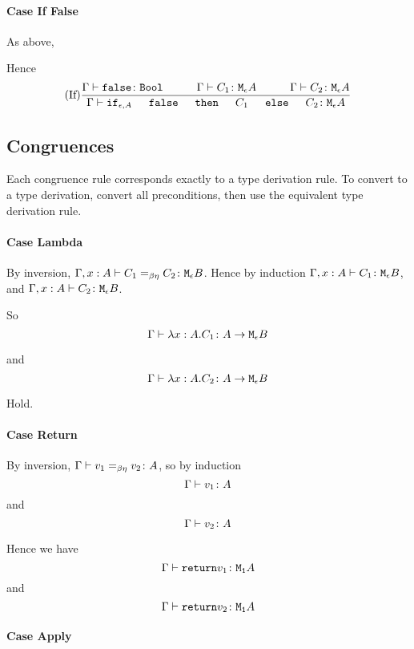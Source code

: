 {        \paragraph{Case If False}
        As above,

        Hence 
        \begin{equation}
            \treerule{If}{
                \gtyperelation{\f}{\B}
                \s\s
                \gtyperelation{C_1}{\mea}
                \s\s
                \gtyperelation{C_2}{\mea}
            }{
                \gtyperelation{\ifthenelse{\e}{A}{\f}{C_1}{C_2}}{\mea}
            }
    \end{equation}
        \subsection{Congruences}
    Each congruence rule corresponds exactly to a type derivation rule. To convert to a type derivation, convert all preconditions, then use the equivalent type derivation rule.

    \paragraph{Case Lambda}
        By inversion, $\Gamma, x: A \vdash C_1 =_{\beta\eta} C_2 \colon \texttt{M}_{\epsilon}{B}$. Hence by induction $\Gamma, x: A \vdash C_1 \colon \texttt{M}_{\epsilon}{B}$, and $\Gamma, x: A \vdash C_2 \colon \texttt{M}_{\epsilon}{B}$.

        So 
        \begin{equation}
            \Gamma \vdash \lambda x : A. C_1 \colon A \rightarrow \texttt{M}_{\epsilon}{B}
        \end{equation}

        and
        \begin{equation}
            \Gamma \vdash \lambda x : A. C_2 \colon A \rightarrow \texttt{M}_{\epsilon}{B}
        \end{equation}

        Hold.
    \paragraph{Case Return}
        By inversion, $\Gamma \vdash v_1 =_{\beta\eta} v_2 \colon A$, so by induction $$\Gamma \vdash v_1 \colon A$$ and $$\Gamma \vdash v_2 \colon A$$

        Hence we have $$\Gamma \vdash \texttt{return} v_1 \colon \texttt{M}_{\texttt{1}}{A}$$
        and
        $$\Gamma \vdash \texttt{return} v_2 \colon \texttt{M}_{\texttt{1}}{A}$$
    \paragraph{Case Apply}

}
